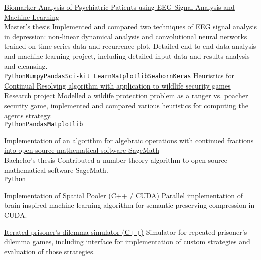 \documentclass[9pt]{developercv} %
\begin{document}
\begin{entrylist}
	\entry
		{}
		{\href{https://www.scribd.com/document/414005885/Biomarker-Analysis-of-Psychiatric-Patients-using-EEG-Signal-Analysis-and-Machine-Learning}{Biomarker Analysis of Psychiatric Patients using EEG Signal Analysis and Machine Learning}}
		{\\Master's thesis}
		{Implemented and compared two techniques of EEG signal analysis in depression: non-linear dynamical analysis and convolutional neural networks trained on time series data and recurrence plot. Detailed end-to-end data analysis and machine learning project, including detailed input data and results analysis and cleansing. \\
         \texttt{Python}\slashsep\texttt{Numpy}\slashsep\texttt{Pandas}\slashsep\texttt{Sci-kit Learn}\slashsep\texttt{Matplotlib}\slashsep\texttt{Seaborn}\slashsep\texttt{Keras}}
	\entry
		{}
		{\href{https://www.scribd.com/document/372696825/Continual-resolving-heuristics-for-the-PAWS-domain}{Heuristics for Continual Resolving algorithm with application to wildlife security games}}
		{\\Research project}
		{Modelled a wildife protection problem as a ranger vs. poacher security game, implemented and compared various heuristics for computing the agents strategy.\\
         \texttt{Python}\slashsep\texttt{Pandas}\slashsep\texttt{Matplotlib}
        }

	\entry
		{}
		{\href{}{Implementation of an algorithm for algebraic operations with continued fractions into open-source mathematical software SageMath}}
		{\\Bachelor's thesis}
		{Contributed a number theory algorithm to open-source mathematical software SageMath.
         \\\texttt{Python}
        }

	\entry
		{}
		{\href{https://github.com/mirgee/sp_cuda}{Implementation of Spatial Pooler (C++ / CUDA)}}
		{}
		{Parallel implementation of brain-inspired machine learning algorithm for semantic-preserving compression in CUDA.
        }

	\entry
		{}
		{\href{https://github.com/mirgee/iterated_prisoner-s_dilemma}{Iterated prisoner's dilemma simulator (C++)}}
		{}
		{Simulator for repeated prisoner's dilemma games, including interface for implementation of custom strategies and evaluation of those strategies.
        }


\end{entrylist}
\end{document}
